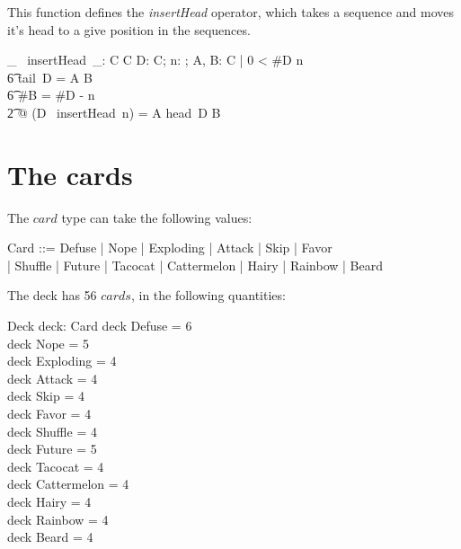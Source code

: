 \documentclass[11pt, fuzz]{article}
\begin{document}
This function defines the \emph{insertHead} operator, which takes a sequence and moves it's head to a give position in the sequences. 

\newcommand{\insertHead}{~insertHead~}

\begin{gendef}[C]
    \_ \insertHead \_: \seq C \cross \nat \fun \seq C
\where
    \forall D: \seq C; n: \nat; A, B: \seq C | 0 < \#D \leq n\\
    \t6 \land tail~D = A \cat B\\
    \t6 \land \#B = \#D - n\\
    \t2 @ (D \insertHead n) = A \cat \langle head~D \rangle \cat B
\end{gendef}

\section{The cards}

The $card$ type can take the following values:

\begin{zed}
    Card ::= Defuse | Nope | Exploding | Attack | Skip | Favor \\| Shuffle | Future | Tacocat | Cattermelon | Hairy | Rainbow | Beard
\end{zed}

The deck has 56 $cards$, in the following quantities:

\begin{schema}{Deck}
    deck: \bag Card
\where
    deck \bcount Defuse      = 6 \\
    deck \bcount Nope        = 5 \\
    deck \bcount Exploding   = 4 \\
    deck \bcount Attack      = 4 \\
    deck \bcount Skip        = 4 \\
    deck \bcount Favor       = 4 \\
    deck \bcount Shuffle     = 4 \\
    deck \bcount Future      = 5 \\
    deck \bcount Tacocat     = 4 \\
    deck \bcount Cattermelon = 4 \\
    deck \bcount Hairy       = 4 \\
    deck \bcount Rainbow     = 4 \\
    deck \bcount Beard       = 4 \\
\end{schema}
\end{document}

